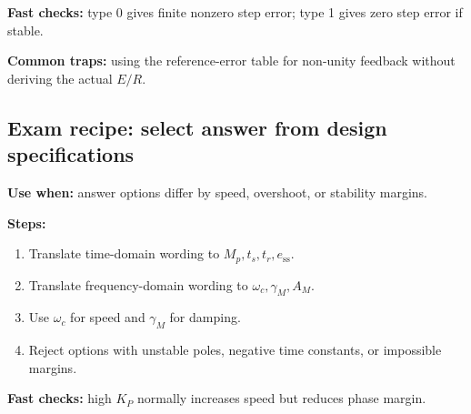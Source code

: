 \textbf{Fast checks:} type 0 gives finite nonzero step error; type 1 gives zero step error if stable.

\textbf{Common traps:} using the reference-error table for non-unity feedback without deriving the actual \(E/R\).

\subsection{Exam recipe: select answer from design specifications}

\textbf{Use when:} answer options differ by speed, overshoot, or stability margins.

\textbf{Steps:}
\begin{enumerate}
\item Translate time-domain wording to \(M_p,t_s,t_r,e_{\mathrm{ss}}\).
\item Translate frequency-domain wording to \(\omega_c,\gamma_M,A_M\).
\item Use \(\omega_c\) for speed and \(\gamma_M\) for damping.
\item Reject options with unstable poles, negative time constants, or impossible margins.
\end{enumerate}

\textbf{Fast checks:} high \(K_P\) normally increases speed but reduces phase margin.
